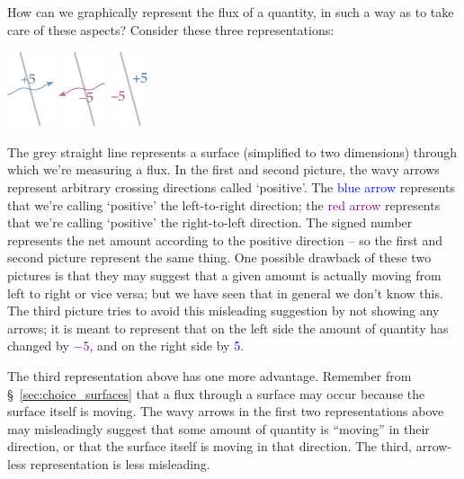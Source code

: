 \documentclass[a4paper,12pt,%
onecolumn,oneside,titlepage,%
british%
]{memoir}
\renewcommand*{\|}[1][]{\nonscript\:#1\vert\nonscript\:\mathopen{}}
\newcommand*{\sect}{\S}%
\begin{document}
How can we graphically represent the flux of a quantity, in such a way as to take care of these aspects? Consider these three representations:
\begin{center}\label{fig:scalar_fluxes}
\hspace*{\fill}\includegraphics[height=6em]{flux_plus5c.pdf}
\hfill\includegraphics[height=6em]{flux_minus5c.pdf}
\hfill\includegraphics[height=6em]{flux_minusplus5.pdf}
\hspace*{\fill}
\end{center}
The \textcolor{midgrey}{grey straight line} represents a surface (simplified to two dimensions) through which we're measuring a flux. In the first and second picture, the wavy arrows represent arbitrary crossing directions called \enquote*{positive}. The \textcolor{blue}{blue arrow} represents that we're calling \enquote*{positive} the left-to-right direction; the \textcolor{purple}{red arrow} represents that we're calling \enquote*{positive} the right-to-left direction. The signed number represents the net amount according to the positive direction -- so the first and second picture represent the same thing. One possible drawback of these two pictures is that they may suggest that a given amount is actually moving from left to right or vice versa; but we have seen that in general we don't know this.
The third picture tries to avoid this misleading suggestion by not showing any arrows; it is meant to represent that on the left side the amount of quantity has changed by \textcolor{purple}{\num{-5}}, and on the right side by \textcolor{blue}{\num{+5}}.

The third representation above has one more advantage. Remember from \sect~\ref{sec:choice_surfaces} that a flux through a surface may occur because the surface itself is moving. The wavy arrows in the first two representations above may misleadingly suggest that some amount of quantity is \enquote{moving} in their direction, or that the surface itself is moving in that direction. The third, arrow-less representation is less misleading.
\end{document}
